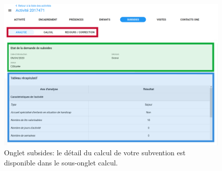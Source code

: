 \begin{figure}[h]
    \centering
    \includegraphics[width=16cm]{Images/cdv/cdv-ds-details.png}
    \caption{Onglet subsides: le détail du calcul de votre subvention est disponible dans le sous-onglet calcul.}
    \label{fig:cdv_onglet_subsides}
\end{figure}